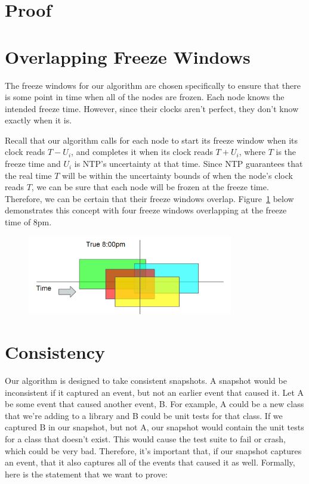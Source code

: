 \section{Proof}
\label{sec:proof}

\section{Overlapping Freeze Windows}

The freeze windows for our algorithm are chosen specifically to ensure
that there is some point in time when all of the nodes are
frozen. Each node knows the intended freeze time. However, since their
clocks aren’t perfect, they don’t know exactly when it is.

Recall that our algorithm calls for each node to start its freeze
window when its clock reads $T - U_i$, and completes it when its clock
reads $T + U_i$, where $T$ is the freeze time and $U_i$ is NTP’s uncertainty
at that time. Since NTP guarantees that the real time $T$ will be within
the uncertainty bounds of when the node’s clock reads $T$, we can be
sure that each node will be frozen at the freeze time. Therefore, we
can be certain that their freeze windows overlap. 
Figure~\ref{fig:overlapping-windows} below
demonstrates this concept with four freeze windows overlapping at the freeze 
time of 8pm.

\begin{figure}[h]
  \centering
  \label{fig:overlapping-windows}
  \includegraphics[width=0.8\textwidth]{overlapping-windows.png}
\end{figure}

\section{Consistency}

Our algorithm is designed to take consistent snapshots. A snapshot
would be inconsistent if it captured an event, but not an earlier
event that caused it. Let A be some event that caused another event, B. 
For example, A could be a new class that we’re adding to a
library and B could be unit tests for that class. If we captured B in
our snapshot, but not A, our snapshot would contain the unit tests for
a class that doesn’t exist. This would cause the test suite to fail or
crash, which could be very bad. Therefore, it’s important that, if our
snapshot captures an event, that it also captures all of the events that
caused it as well. Formally, here is the statement that we want to
prove:

